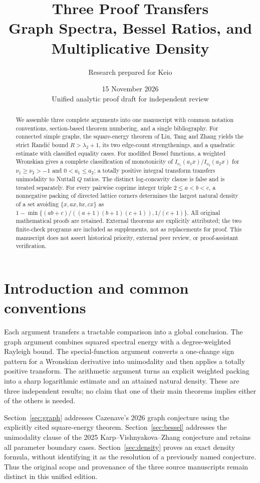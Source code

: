 \documentclass[11pt,a4paper]{article}
\title{\textbf{Three Proof Transfers}\\[6pt]
\large Graph Spectra, Bessel Ratios, and Multiplicative Density}
\author{Research prepared for Keio}
\date{15 November 2026\\\small Unified analytic proof draft for independent review}
\theoremstyle{remark}\newtheorem{remark}[theorem]{Remark}
\numberwithin{equation}{section}
\begin{document}
\maketitle
\begin{abstract}
We assemble three complete arguments into one manuscript with common
notation conventions, section-based theorem numbering, and a single bibliography.
For connected simple graphs, the square-energy theorem of Liu, Tang and
Zhang yields the strict Randi\'c bound $R>\lambda_2+1$, its two edge-count
strengthenings, and a quadratic estimate with classified equality cases.
For modified Bessel functions, a weighted Wronskian gives a complete
classification of monotonicity of $I_{\nu_1}(a_1x)/I_{\nu_2}(a_2x)$
for $\nu_1\ge\nu_2>-1$ and $0<a_1\le a_2$; a totally positive
integral transform transfers unimodality to Nuttall $Q$ ratios.
The distinct log-concavity clause is false and is treated separately.
For every pairwise coprime integer triple $2\le a<b<c$, a nonnegative
packing of directed lattice corners determines the largest natural
density of a set avoiding $\{x,ax,bx,cx\}$ as
$1-\min\{(ab+c)/((a+1)(b+1)(c+1)),1/(c+1)\}$.
All original mathematical proofs are retained. External theorems are
explicitly attributed; the two finite-check programs are included as
supplements, not as replacements for proof. This manuscript does not
assert historical priority, external peer review, or proof-assistant verification.
\end{abstract}
\tableofcontents

\section{Introduction and common conventions}
Each argument transfers a tractable comparison into a global conclusion.
The graph argument combines squared spectral energy with a degree-weighted
Rayleigh bound. The special-function argument converts a one-change sign
pattern for a Wronskian derivative into unimodality and then applies a
totally positive transform. The arithmetic argument turns an explicit
weighted packing into a sharp logarithmic estimate and an attained
natural density. These are three independent results; no claim that one
of their main theorems implies either of the others is needed.

Section~\ref{sec:graph} addresses Cazenave's 2026 graph conjecture using
the explicitly cited square-energy theorem. Section~\ref{sec:bessel}
addresses the unimodality clause of the 2025 Karp--Vishnyakova--Zhang
conjecture and retains all parameter boundary cases.
Section~\ref{sec:density} proves an exact density formula, without
identifying it as the resolution of a previously named conjecture.
Thus the original scope and provenance of the three source manuscripts
remain distinct in this unified edition.
\end{document}
